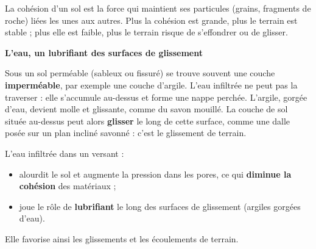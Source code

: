\documentclass[11pt]{article}
\newcommand{\cle}[1]{{\popxbold\color{popdark}#1}}
\begin{document}
\begin{definition}
La \cle{cohésion} d'un sol est la force qui maintient ses particules (grains, fragments de roche) liées les unes aux autres. Plus la cohésion est grande, plus le terrain est stable ; plus elle est faible, plus le terrain risque de s'effondrer ou de glisser.
\end{definition}

\textbf{L'eau, un lubrifiant des surfaces de glissement}

Sous un sol perméable (sableux ou fissuré) se trouve souvent une couche \textbf{imperméable}, par exemple une couche d'\cle{argile}. L'eau infiltrée ne peut pas la traverser : elle s'accumule au-dessus et forme une \cle{nappe perchée}. L'argile, gorgée d'eau, devient molle et glissante, comme du savon mouillé. La couche de sol située au-dessus peut alors \textbf{glisser} le long de cette surface, comme une dalle posée sur un plan incliné savonné : c'est le \cle{glissement de terrain}.

\begin{propriete}
L'eau infiltrée dans un versant :
\begin{itemize}
\item alourdit le sol et augmente la pression dans les pores, ce qui \textbf{diminue la cohésion} des matériaux ;
\item joue le rôle de \textbf{lubrifiant} le long des surfaces de glissement (argiles gorgées d'eau).
\end{itemize}
Elle favorise ainsi les glissements et les écoulements de terrain.
\end{propriete}
\end{document}

